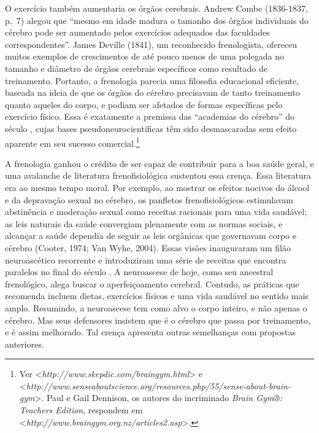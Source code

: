 O exercício também aumentaria os órgãos cerebrais. Andrew Combe
(1836-1837, p.~7) alegou que ``mesmo em idade madura o tamanho dos órgãos
individuais do cérebro pode ser aumentado pelos exercícios adequados das
faculdades correspondentes''. James Deville (1841), um reconhecido
frenologista, ofereceu muitos exemplos de crescimentos de até pouco
menos de uma polegada no tamanho e diâmetro de órgãos cerebrais
específicos como resultado de treinamento. Portanto, a frenologia
parecia uma filosofia educacional eficiente, baseada na ideia de que os
órgãos do cérebro precisavam de tanto treinamento quanto aqueles do
corpo, e podiam ser afetados de formas específicas pelo exercício
físico. Essa é exatamente a premissa das ``academias do cérebro'' do
século , cujas bases pseudoneurocientíficas têm sido desmascaradas sem
efeito aparente em seu sucesso comercial.\footnote[12]{Ver \textless{}\emph{http://www.skepdic.com/braingym.html}\textgreater{} e
\textless{}\emph{http://www.senseaboutscience.org/resources.php/55/sense-about-brain-gym}\textgreater{}.
Paul e Gail Dennison, os autores do incriminado \emph{Brain Gym®:
Teachers Edition}, respondem em
\textless{}\emph{http://www.braingym.org.nz/articles2.asp}\textgreater{}.}

A frenologia ganhou o crédito de ser capaz de contribuir para a boa
saúde geral, e uma avalanche de literatura frenofisiológica sustentou
essa crença. Essa literatura era ao mesmo tempo moral. Por exemplo, ao
mostrar os efeitos nocivos do álcool e da depravação sexual no cérebro,
os panfletos frenofisiológicos estimulavam abstinência e moderação sexual
como receitas racionais para uma vida saudável; as leis naturais da
saúde convergiam plenamente com as normas sociais, e alcançar a saúde
dependia de seguir as leis orgânicas que governavam corpo e cérebro
(Cooter, 1974; Van Wyhe, 2004). Essas visões inauguraram um filão
neuroascético recorrente e introduziram uma série de receitas que
encontra paralelos no final do século . A neuroascese de hoje, como
seu ancestral frenológico, alega buscar o aperfeiçoamento cerebral.
Contudo, as práticas que recomenda incluem dietas, exercícios físicos e
uma vida saudável no sentido mais amplo. Resumindo, a neuroascese tem
como alvo o corpo inteiro, e não apenas o cérebro. Mas seus defensores
insistem que é o cérebro que passa por treinamento, e é assim
melhorado. Tal crença apresenta outras semelhanças com propostas
anteriores.

